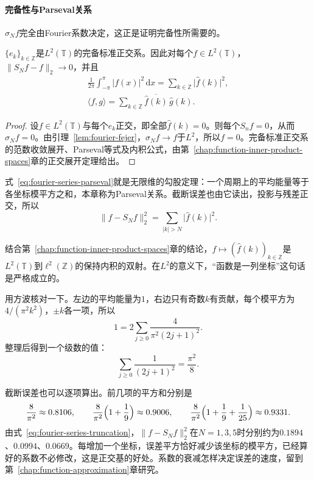 \paragraph{完备性与Parseval关系}

$\sigma_Nf$完全由Fourier系数决定，这正是证明完备性所需要的。

\begin{theorem}[$L^2$中的Fourier展开]
\label{thm:fourier-series-l2}
$\{e_k\}_{k\in\mathbb Z}$是$L^2(\mathbb T)$的完备标准正交系。因此对每个$f\in L^2(\mathbb T)$，$\lVert S_Nf-f\rVert_2\to0$，并且
\begin{equation}
\begin{gathered}
\frac1{2\pi}\int_{-\pi}^{\pi}\lvert f(x)\rvert^2\,\mathrm dx=\sum_{k\in\mathbb Z}\lvert\widehat f(k)\rvert^2 ,\\
\langle f,g\rangle=\sum_{k\in\mathbb Z}\overline{\widehat f(k)}\,\widehat g(k) .
\end{gathered}
\label{eq:fourier-series-parseval}
\end{equation}
\end{theorem}

\begin{proof}
设$f\in L^2(\mathbb T)$与每个$e_k$正交，即全部$\widehat f(k)=0$。则每个$S_nf=0$，从而$\sigma_Nf=0$。由引理~\ref{lem:fourier-fejer}，$\sigma_Nf\to f$于$L^2$，所以$f=0$。完备标准正交系的范数收敛展开、Parseval等式及内积公式，由第~\ref{chap:function-inner-product-spaces}章的正交展开定理给出。
\end{proof}

式~\eqref{eq:fourier-series-parseval}就是无限维的勾股定理：一个周期上的平均能量等于各坐标模平方之和，本章称为Parseval关系。截断误差也由它读出，投影与残差正交，所以
\begin{equation}
\lVert f-S_Nf\rVert_2^2=\sum_{\lvert k\rvert>N}\lvert\widehat f(k)\rvert^2 .
\label{eq:fourier-series-truncation}
\end{equation}

结合第~\ref{chap:function-inner-product-spaces}章的结论，$f\mapsto(\widehat f(k))_{k\in\mathbb Z}$是$L^2(\mathbb T)$到$\ell^2(\mathbb Z)$的保持内积的双射。在$L^2$的意义下，“函数是一列坐标”这句话是严格成立的。

用方波核对一下。左边的平均能量为$1$，右边只有奇数$k$有贡献，每个模平方为$4/(\pi^2k^2)$，$\pm k$各一项，所以
\[
1=2\sum_{j\geq0}\frac{4}{\pi^2(2j+1)^2}.
\]
整理后得到一个级数的值：
\[
\sum_{j\geq0}\frac1{(2j+1)^2}=\frac{\pi^2}8 .
\]

截断误差也可以逐项算出。前几项的平方和分别是
\[
\frac8{\pi^2}\approx0.8106,\qquad
\frac8{\pi^2}\Bigl(1+\frac19\Bigr)\approx0.9006,\qquad
\frac8{\pi^2}\Bigl(1+\frac19+\frac1{25}\Bigr)\approx0.9331.
\]
由式~\eqref{eq:fourier-series-truncation}，$\lVert f-S_Nf\rVert_2^2$在$N=1,3,5$时分别约为$0.1894$、$0.0994$、$0.0669$。每增加一个坐标，误差平方恰好减少该坐标的模平方，已经算好的系数不必修改，这是正交基的好处。系数的衰减怎样决定误差的速度，留到第~\ref{chap:function-approximation}章研究。

